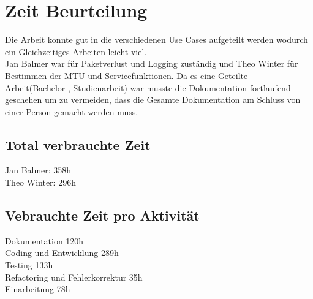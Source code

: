 \chapter{Zeit Beurteilung}
Die Arbeit konnte gut in die verschiedenen Use Cases aufgeteilt werden wodurch ein Gleichzeitiges Arbeiten leicht viel.\\
Jan Balmer war für Paketverlust und Logging zuständig und Theo Winter für Bestimmen der MTU und Servicefunktionen.
Da es eine Geteilte Arbeit(Bachelor-, Studienarbeit) war musste die Dokumentation fortlaufend geschehen um zu vermeiden, dass die Gesamte Dokumentation am Schluss von einer Person gemacht werden muss.\\

\section{Total verbrauchte Zeit}
Jan Balmer: 358h\\
Theo Winter: 296h 

\section{Vebrauchte Zeit pro Aktivität}
Dokumentation 120h\\
Coding und Entwicklung 289h\\
Testing 133h\\
Refactoring und Fehlerkorrektur 35h\\
Einarbeitung 78h
